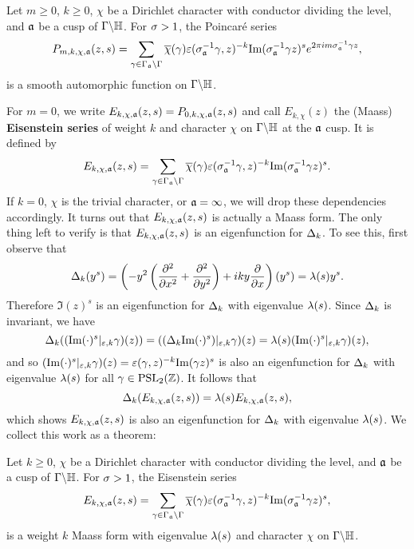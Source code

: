     \begin{theorem}
      Let $m \ge 0$, $k \ge 0$, $\chi$ be a Dirichlet character with conductor dividing the level, and $\mathfrak{a}$ be a cusp of $\Gamma\backslash\mathbb{H}$. For $\sigma > 1$, the Poincar\'e series
      \[
        P_{m,k,\chi,\mathfrak{a}}(z,s) = \sum_{\gamma \in \Gamma_{\mathfrak{a}}\backslash\Gamma}\overline{\chi}(\gamma)\varepsilon(\sigma_{\mathfrak{a}}^{-1}\gamma,z)^{-k}\mathrm{Im}(\sigma_{\mathfrak{a}}^{-1}\gamma z)^{s}e^{2\pi im\sigma_{\mathfrak{a}}^{-1}\gamma z},
      \]
      is a smooth automorphic function on $\Gamma\backslash\mathbb{H}$.
    \end{theorem}
    
    For $m = 0$, we write $E_{k,\chi,\mathfrak{a}}(z,s) = P_{0,k,\chi,\mathfrak{a}}(z,s)$ and call $E_{k,\chi}(z)$ the (Maass) \textbf{Eisenstein series} of weight $k$ and character $\chi$ on $\Gamma\backslash\mathbb{H}$ at the $\mathfrak{a}$ cusp. It is defined by
    \[
      E_{k,\chi,\mathfrak{a}}(z,s) = \sum_{\gamma \in \Gamma_{\mathfrak{a}}\backslash\Gamma}\overline{\chi}(\gamma)\varepsilon(\sigma_{\mathfrak{a}}^{-1}\gamma,z)^{-k}\mathrm{Im}(\sigma_{\mathfrak{a}}^{-1}\gamma z)^{s}.
    \]
    If $k = 0$, $\chi$ is the trivial character, or $\mathfrak{a} = \infty$, we will drop these dependencies accordingly. It turns out that $E_{k,\chi,\mathfrak{a}}(z,s)$ is actually a Maass form. The only thing left to verify is that $E_{k,\chi,\mathfrak{a}}(z,s)$ is an eigenfunction for $\Delta_{k}$. To see this, first observe that
    \[
      \Delta_{k}(y^{s}) = \left(-y^{2}\left(\frac{\partial^{2}}{\partial x^{2}}+\frac{\partial^{2}}{\partial y^{2}}\right)+iky\frac{\partial}{\partial x}\right)(y^{s}) = \lambda(s)y^{s}.
    \]
    Therefore $\Im(z)^{s}$ is an eigenfunction for $\Delta_{k}$ with eigenvalue $\lambda(s)$. Since $\Delta_{k}$ is invariant, we have
    \[
      \Delta_{k}((\mathrm{Im}(\cdot)^{s}|_{\varepsilon,k}\gamma)(z)) = ((\Delta_{k}\mathrm{Im}(\cdot)^{s})|_{\varepsilon,k}\gamma)(z) = \lambda(s)(\mathrm{Im}(\cdot)^{s}|_{\varepsilon,k}\gamma)(z),
    \]
    and so $(\mathrm{Im}(\cdot)^{s}|_{\varepsilon,k}\gamma)(z) = \varepsilon(\gamma,z)^{-k}\mathrm{Im}(\gamma z)^{s}$ is also an eigenfunction for $\Delta_{k}$ with eigenvalue $\lambda(s)$ for all $\gamma \in \mathrm{PSL}_{2}(\mathbb{Z})$. It follows that
    \[
      \Delta_{k}(E_{k,\chi,\mathfrak{a}}(z,s)) = \lambda(s)E_{k,\chi,\mathfrak{a}}(z,s),
    \]
    which shows $E_{k,\chi,\mathfrak{a}}(z,s)$ is also an eigenfunction for $\Delta_{k}$ with eigenvalue $\lambda(s)$. We collect this work as a theorem:

    \begin{theorem}
      Let $k \ge 0$, $\chi$ be a Dirichlet character with conductor dividing the level, and $\mathfrak{a}$ be a cusp of $\Gamma\backslash\mathbb{H}$. For $\sigma > 1$, the Eisenstein series
      \[
        E_{k,\chi,\mathfrak{a}}(z,s) = \sum_{\gamma \in \Gamma_{\mathfrak{a}}\backslash\Gamma}\overline{\chi}(\gamma)\varepsilon(\sigma_{\mathfrak{a}}^{-1}\gamma,z)^{-k}\mathrm{Im}(\sigma_{\mathfrak{a}}^{-1}\gamma z)^{s},
      \]
      is a weight $k$ Maass form with eigenvalue $\lambda(s)$ and character $\chi$ on $\Gamma\backslash\mathbb{H}$.
    \end{theorem}
